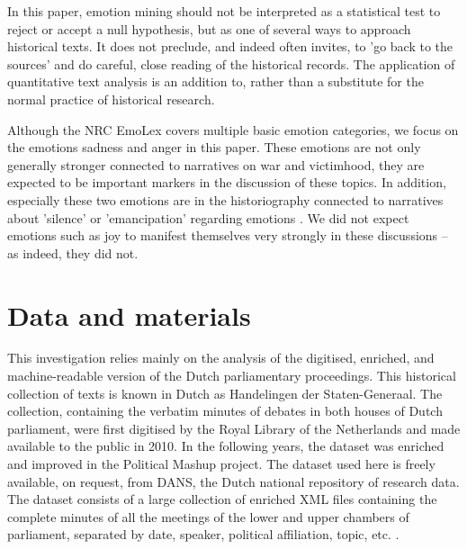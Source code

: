 \documentclass{dhbenelux}
\begin{document}
In this paper, emotion mining should not be interpreted as a statistical test to reject or accept a null hypothesis, but as one of several ways to approach historical texts. It does not preclude, and indeed often invites, to 'go back to the sources' and do careful, close reading of the historical records. The application of quantitative text analysis is an addition to, rather than a substitute for the normal practice of historical research.

Although the NRC EmoLex covers multiple basic emotion categories, we focus on the emotions sadness and anger in this paper. These emotions are not only generally stronger connected to narratives on war and victimhood, they are expected to be important markers in the discussion of these topics. In addition, especially these two emotions are in the historiography connected to narratives about 'silence' or 'emancipation' regarding emotions \citep{brudholm_introduction_2019, beunders_publieke_2002}. We did not expect emotions such as joy to manifest themselves very strongly in these discussions – as indeed, they did not.

\section{Data and materials}
This investigation relies mainly on the analysis of the digitised, enriched, and machine-readable version of the Dutch parliamentary proceedings. This historical collection of texts is known in Dutch as Handelingen der Staten-Generaal. The collection, containing the verbatim minutes of debates in both houses of Dutch parliament, were first digitised by the Royal Library of the Netherlands and made available to the public in 2010. In the following years, the dataset was enriched and improved in the Political Mashup project. The dataset used here is freely available, on request, from DANS, the Dutch national repository of research data. The dataset consists of a large collection of enriched XML files containing the complete minutes of all the meetings of the lower and upper chambers of parliament, separated by date, speaker, political affiliation, topic, etc. \citep{marx_thematic_2012}.
\end{document}
